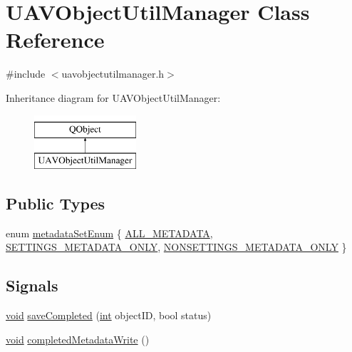 \hypertarget{class_u_a_v_object_util_manager}{\section{U\-A\-V\-Object\-Util\-Manager Class Reference}
\label{class_u_a_v_object_util_manager}
}


{\ttfamily \#include $<$uavobjectutilmanager.\-h$>$}

Inheritance diagram for U\-A\-V\-Object\-Util\-Manager\-:\begin{figure}[H]
\begin{center}
\leavevmode
\includegraphics[height=2.000000cm]{class_u_a_v_object_util_manager}
\end{center}
\end{figure}
\subsection*{Public Types}
\begin{DoxyCompactItemize}
\item 
enum \hyperlink{group___u_a_v_objects_plugin_ga3f0971e47d6ebe87f97939435cd03da3}{metadata\-Set\-Enum} \{ \hyperlink{group___u_a_v_objects_plugin_gga3f0971e47d6ebe87f97939435cd03da3ac18452db1ea15afd4d64e97a407429cd}{A\-L\-L\-\_\-\-M\-E\-T\-A\-D\-A\-T\-A}, 
\hyperlink{group___u_a_v_objects_plugin_gga3f0971e47d6ebe87f97939435cd03da3a80d58d5e87824282131d8df8b346cf46}{S\-E\-T\-T\-I\-N\-G\-S\-\_\-\-M\-E\-T\-A\-D\-A\-T\-A\-\_\-\-O\-N\-L\-Y}, 
\hyperlink{group___u_a_v_objects_plugin_gga3f0971e47d6ebe87f97939435cd03da3a2629c57c3e595b842a552395cedd97c9}{N\-O\-N\-S\-E\-T\-T\-I\-N\-G\-S\-\_\-\-M\-E\-T\-A\-D\-A\-T\-A\-\_\-\-O\-N\-L\-Y}
 \}
\end{DoxyCompactItemize}
\subsection*{Signals}
\begin{DoxyCompactItemize}
\item 
\hyperlink{group___u_a_v_objects_plugin_ga444cf2ff3f0ecbe028adce838d373f5c}{void} \hyperlink{group___u_a_v_objects_plugin_ga34993cd463a734315dd04903a4e2de24}{save\-Completed} (\hyperlink{ioapi_8h_a787fa3cf048117ba7123753c1e74fcd6}{int} object\-I\-D, bool status)
\item 
\hyperlink{group___u_a_v_objects_plugin_ga444cf2ff3f0ecbe028adce838d373f5c}{void} \hyperlink{group___u_a_v_objects_plugin_gaf343ab5f4e4710c85cd7977ae7563ca1}{completed\-Metadata\-Write} ()
\end{DoxyCompactItemize}
